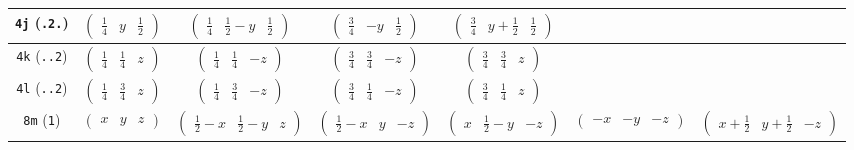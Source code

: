 \documentclass[fleqn,9pt,landscape]{jsarticle}
\begin{document}
\begin{center}
\begin{longtable}{ccccccc}
{\tt 4j} ({\tt .2.}) & $ \begin{pmatrix} \frac{1}{4} & y & \frac{1}{2} \end{pmatrix} $ & $ \begin{pmatrix} \frac{1}{4} & \frac{1}{2} - y & \frac{1}{2} \end{pmatrix} $ & $ \begin{pmatrix} \frac{3}{4} & - y & \frac{1}{2} \end{pmatrix} $ & $ \begin{pmatrix} \frac{3}{4} & y + \frac{1}{2} & \frac{1}{2} \end{pmatrix} $ & $  $ & $  $ \\ \hline
{\tt 4k} ({\tt ..2}) & $ \begin{pmatrix} \frac{1}{4} & \frac{1}{4} & z \end{pmatrix} $ & $ \begin{pmatrix} \frac{1}{4} & \frac{1}{4} & - z \end{pmatrix} $ & $ \begin{pmatrix} \frac{3}{4} & \frac{3}{4} & - z \end{pmatrix} $ & $ \begin{pmatrix} \frac{3}{4} & \frac{3}{4} & z \end{pmatrix} $ & $  $ & $  $ \\ \hline
{\tt 4l} ({\tt ..2}) & $ \begin{pmatrix} \frac{1}{4} & \frac{3}{4} & z \end{pmatrix} $ & $ \begin{pmatrix} \frac{1}{4} & \frac{3}{4} & - z \end{pmatrix} $ & $ \begin{pmatrix} \frac{3}{4} & \frac{1}{4} & - z \end{pmatrix} $ & $ \begin{pmatrix} \frac{3}{4} & \frac{1}{4} & z \end{pmatrix} $ & $  $ & $  $ \\ \hline
{\tt 8m} ({\tt 1}) & $ \begin{pmatrix} x & y & z \end{pmatrix} $ & $ \begin{pmatrix} \frac{1}{2} - x & \frac{1}{2} - y & z \end{pmatrix} $ & $ \begin{pmatrix} \frac{1}{2} - x & y & - z \end{pmatrix} $ & $ \begin{pmatrix} x & \frac{1}{2} - y & - z \end{pmatrix} $ & $ \begin{pmatrix} - x & - y & - z \end{pmatrix} $ & $ \begin{pmatrix} x + \frac{1}{2} & y + \frac{1}{2} & - z \end{pmatrix} $ \\

\end{longtable}
\end{center}
\end{document}

